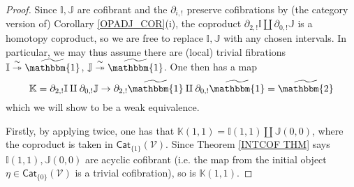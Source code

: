 \documentclass[a4paper,10pt
,draft
]{article}%
\numberwithin{equation}{section}
\numberwithin{figure}{section}
\theoremstyle{definition} %
\newcommand{\Cat}{\mathsf{Cat}}
\newcommand{\V}{\ensuremath{\mathcal V}}
\newcommand{\1}{\ensuremath{\mathbbm 1}}%
\begin{document}
\begin{proof}
Since $\mathbb{I},\mathbb{J}$ are cofibrant and the $\partial_{i,!}$
preserve cofibrations by
(the category version of)
Corollary \ref{OPADJ_COR}(i), %
the coproduct 
$\partial_{2,!} \mathbb{I} \amalg \partial_{0,!} \mathbb{J}$
is a homotopy coproduct, 
so we are free to replace $\mathbb{I},\mathbb{J}$
with any chosen intervals.
In particular, we may thus assume there are (local) trivial fibrations
$\mathbb{I} \overset{\sim}{\twoheadrightarrow} \widetilde{\mathbbm{1}}$,
$\mathbb{J} \overset{\sim}{\twoheadrightarrow} \widetilde{\mathbbm{1}}$.
One then has a map
\[
\mathbb{K}=
\partial_{2,!} \mathbb{I} \amalg \partial_{0,!} \mathbb{J}
\to
\partial_{2,!} \widetilde{\mathbbm{1}} \amalg \partial_{0,!} \widetilde{\mathbbm{1}}
= \widetilde{\mathbbm{2}}
\]
which we will show to be a weak equivalence.


Firstly, by applying \cite[Cor. \ref{OC-FGTPUSH_COR}]{BP_FCOP} twice,
one has that $\mathbb{K}(1,1)= \mathbb{I}(1,1) \amalg \mathbb{J}(0,0)$,
where the coproduct is taken in $\Cat_{\{1\}}(\V)$.
Since Theorem \ref{INTCOF THM} says $\mathbb{I}(1,1),\mathbb{J}(0,0)$
are acyclic cofibrant 
(i.e. the map from the initial object 
$\eta \in \mathsf{Cat}_{\{0\}}(\V)$
is a trivial cofibration),
so is $\mathbb{K}(1,1)$.



\end{proof}
\end{document}
